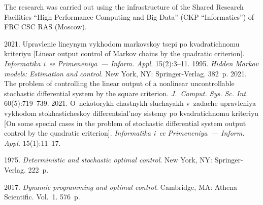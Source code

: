       
      
     
      


 \Ack
      \noindent
      The research was carried out using the infrastructure of the Shared Research Facilities ``High 
Performance Computing and Big Data'' (CKP ``Informatics'') of FRC CSC RAS (Moscow).





  \begin{multicols}{2}

\renewcommand{\bibname}{\protect\rmfamily References}

{\small\frenchspacing
 {%
 \begin{thebibliography}{99}
       2021. Upravlenie lineynym vykhodom mar\-kov\-skoy tsepi po 
kvadratichnomu kriteriyu [Linear output control of Markov chains by the quadratic criterion]. 
\textit{Informatika i~ee Primeneniya~--- Inform. Appl.} 15(2):3--11.
       1995. \textit{Hidden Markov models: 
Estimation and control.} New York, NY: Springer-Verlag. 382~p.
       2021. The problem of controlling the linear output of a nonlinear 
uncontrollable stochastic differential system by the square criterion. \textit{J.~Comput. Sys. 
Sc. Int.}  60(5):719--739.
       2021. O~nekotorykh chastnykh sluchayakh v~zadache upravleniya 
vykhodom stokhasticheskoy differentsial'noy sistemy po kvadratichnomu kriteriyu [On some special 
cases in the problem of stochastic differential system output control by the quadratic criterion]. 
\textit{Informatika i~ee Primeneniya~--- Inform. Appl.} 15(1):11--17.
    
       1975. \textit{Deterministic and stochastic optimal 
control}. New York, NY: Springer-Verlag. 222~p.

       2017. \textit{Dynamic programming and optimal control}. Cambridge, MA: 
Athena Scientific. Vol.~1. 576~p.


\end{thebibliography}}}
\end{multicols}
